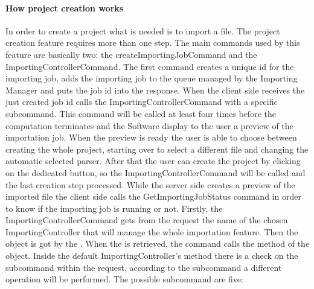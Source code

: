 \paragraph{How project creation works} In order to create a project what is needed is to import a file. The project creation feature requires more than one step. The main commands used by this feature are basically two: the createImportingJobCommand and the ImportingControllerCommand. The first command creates a unique id for the importing job, adds the importing job to the queue managed by the Importing Manager and puts the job id into the response. When the client side receives the just created job id calls the ImportingControllerCommand with a specific subcommand. This command will be called at least four times before the computation terminates and the Software display to the user a preview of the importation job. When the preview is ready the user is able to choose between creating the whole project, starting over to select a different file and changing the automatic selected parser. After that the user can create the project by clicking on the dedicated button, so the ImportingControllerCommand will be called and the last creation step processed. While the server side creates a preview of the imported file the client side calls the GetImportingJobStatus command in order to know if the importing job is running or not. Firstly, the ImportingControllerCommand gets from the request the name of the chosen ImportingController that will manage the whole importation feature. Then the  object is got by the . When the  is retrieved, the command calls the  method of the  object. Inside the default ImportingController's  method there is a check on the subcommand within the request, according to the subcommand a different operation will be performed. The possible subcommand are five:
